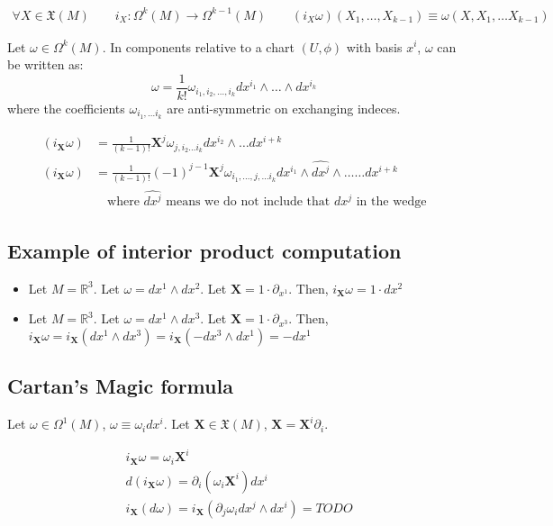 \documentclass[11pt]{book}
\begin{document}
\begin{align*}
\forall X \in \mathfrak X (M)\qquad
i_X: \Omega^k(M) \rightarrow \Omega^{k-1}(M) \qquad
(i_X \omega) (X_1, \dots, X_{k-1}) \equiv \omega(X, X_1, \dots X_{k-1})
\end{align*}

Let $\omega \in \Omega^k(M)$. In components relative to a chart $(U, \phi)$ with
basis $x^i$, $\omega$ can be written as:
$$\omega = \frac{1}{k!} \omega_{i_1, i_2, \dots, i_k} dx^{i_1} \wedge \dots \wedge dx^{i_k}$$
where the coefficients $\omega_{i_1, \dots i_k}$ are anti-symmetric on
exchanging indeces.

\begin{align*}
    (i_{\mathbf X} \omega) &= \frac{1}{(k-1)!}  \mathbf X^j \omega_{j, i_2 \dots i_k} dx^{i_2} \wedge \dots dx^{i+k} \\
    (i_{\mathbf X} \omega) &= \frac{1}{(k-1)!}  (-1)^{j-1} \mathbf X^j \omega_{i_1, \dots, j, \dots i_k} dx^{i_1} \wedge \widehat{dx^j} \wedge \dots \dots dx^{i+k} \\
    &\quad \text{where $\widehat{dx^j}$ means we do not include that $dx^j$ in the wedge}
\end{align*}

\subsection{Example of interior product computation}
\begin{itemize}
    \item Let $M = \mathbb R^3$. Let $\omega = dx^1 \wedge dx^2$. Let $\mathbf X = 1 \cdot \partial_{x^1}$.
Then, $i_\mathbf X \omega = 1 \cdot dx^2$


\item Let $M = \mathbb R^3$. Let $\omega = dx^1 \wedge dx^3$. Let $\mathbf X = 1 \cdot \partial_{x^3}$.
Then, $i_{\mathbf X} \omega = i_{\mathbf X} (dx^1 \wedge dx^3) = i_{\mathbf X}(-dx^3 \wedge dx^1) = -dx^1$
\end{itemize}

\subsection{Cartan's Magic formula}
Let $\omega \in \Omega^1(M)$, $\omega \equiv \omega_i dx^i$.
Let $\mathbf X \in \mathfrak X(M)$, $\mathbf X = \mathbf X^i \partial_i$.

\begin{align*}
&i_{\mathbf X} \omega = \omega_i \mathbf X^i \\
&d(i_{\mathbf X} \omega) = \partial_i (\omega_i \mathbf X^i) dx^i \\
&i_{\mathbf X}(d \omega) = i_{\mathbf X}( \partial_j \omega_i dx^j \wedge dx^i)
	= TODO %
\end{align*}
\end{document}
